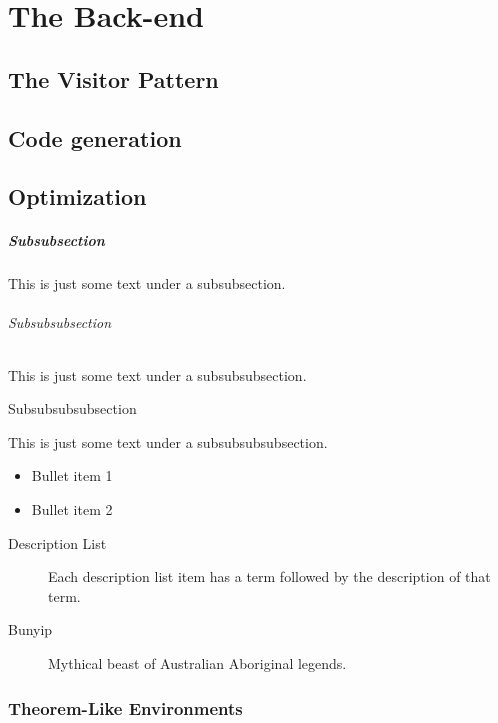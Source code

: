 \documentclass[letterpaper,12pt,openany,reqno]{book}%
\begin{document}
\part{The Back-end}
\chapter {The Visitor Pattern}
\chapter {Code generation}
\chapter {Optimization}

\subsubsection{Subsubsection}

This is just some text under a subsubsection.

\paragraph{Subsubsubsection}

This is just some  text under a subsubsubsection.

\subparagraph{Subsubsubsubsection}

This is just some text under a subsubsubsubsection.


\begin{itemize}
\item Bullet item 1

\item Bullet item 2

\end{itemize}

\begin{description}
\item[Description List] Each description list item has a term followed by the
description of that term.

\item[Bunyip] Mythical beast of Australian Aboriginal legends.
\end{description}

\section{Theorem-Like Environments}
\end{document}
